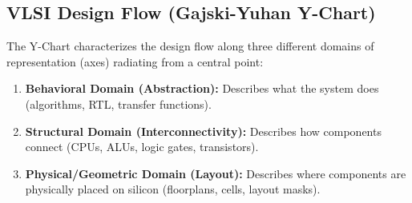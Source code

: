 \documentclass[12pt,a4paper]{article}
\begin{document}
\subsection{VLSI Design Flow (Gajski-Yuhan Y-Chart)}
The Y-Chart characterizes the design flow along three different domains of representation (axes) radiating from a central point:
\begin{enumerate}[label=\arabic*., leftmargin=*]
  \item \textbf{Behavioral Domain (Abstraction):} Describes what the system does (algorithms, RTL, transfer functions).
  \item \textbf{Structural Domain (Interconnectivity):} Describes how components connect (CPUs, ALUs, logic gates, transistors).
  \item \textbf{Physical/Geometric Domain (Layout):} Describes where components are physically placed on silicon (floorplans, cells, layout masks).
\end{enumerate}
\end{document}
